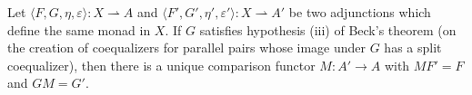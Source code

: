 Let $\langle F, G, \eta, \varepsilon \rangle: X \rightharpoonup A$ and $\langle F', G', \eta', \varepsilon' \rangle: X \rightharpoonup A'$ be two adjunctions which define the same monad in $X$. If $G$ satisfies hypothesis (iii) of Beck's theorem (on the creation of coequalizers for parallel pairs whose image under $G$ has a split coequalizer), then there is a unique comparison functor $M: A' \to A$ with $MF' = F$ and $GM = G'$.
